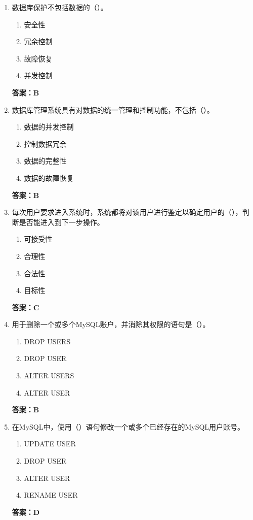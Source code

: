 \documentclass[12pt, a4paper]{article}
\begin{document}
\begin{enumerate}[label=\arabic*.]
	\item 数据库保护不包括数据的（\quad）。
	      \begin{enumerate}
		      \item 安全性
		      \item 冗余控制
		      \item 故障恢复
		      \item 并发控制
	      \end{enumerate}
	      \textbf{答案：B}

	\item 数据库管理系统具有对数据的统一管理和控制功能，不包括（\quad）。
	      \begin{enumerate}
		      \item 数据的并发控制
		      \item 控制数据冗余
		      \item 数据的完整性
		      \item 数据的故障恢复
	      \end{enumerate}
	      \textbf{答案：B}

	\item 每次用户要求进入系统时，系统都将对该用户进行鉴定以确定用户的（\quad），判断是否能进入到下一步操作。
	      \begin{enumerate}
		      \item 可接受性
		      \item 合理性
		      \item 合法性
		      \item 目标性
	      \end{enumerate}
	      \textbf{答案：C}

	\item 用于删除一个或多个MySQL账户，并消除其权限的语句是（\quad）。
	      \begin{enumerate}
		      \item DROP USERS
		      \item DROP USER
		      \item ALTER USERS
		      \item ALTER USER
	      \end{enumerate}
	      \textbf{答案：B}

	\item 在MySQL中，使用（\quad）语句修改一个或多个已经存在的MySQL用户账号。
	      \begin{enumerate}
		      \item UPDATE USER
		      \item DROP USER
		      \item ALTER USER
		      \item RENAME USER
	      \end{enumerate}
	      \textbf{答案：D}


\end{enumerate}
\end{document}
